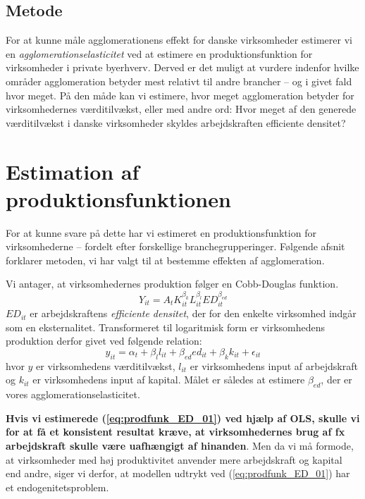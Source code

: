 \subsection{Metode}
For at kunne måle agglomerationens effekt for danske virksomheder estimerer vi en \emph{agglomerationselasticitet} ved at estimere en produktionsfunktion for virksomheder i private byerhverv. Derved er det muligt at vurdere indenfor hvilke områder agglomeration betyder mest relativt til andre brancher -- og i givet fald hvor meget. På den måde kan vi estimere, hvor meget agglomeration betyder for virksomhedernes værditilvækst, eller med andre ord: Hvor meget af den generede værditilvækst i danske virksomheder skyldes arbejdskraften efficiente densitet?
\section{Estimation af produktionsfunktionen}
For at kunne svare på dette har vi estimeret en produktionsfunktion for virksomhederne -- fordelt efter forskellige branchegrupperinger. Følgende afsnit forklarer metoden, vi har valgt til at bestemme effekten af agglomeration.

Vi antager, at virksomhedernes produktion følger en Cobb-Douglas funktion. 
\begin{equation}
	Y_{it} = A_t K_{it}^{\beta_k} L_{it}^{\beta_l} 
	ED_{it}^{\beta_{ed}}  
\end{equation}
$ED_{it}$ er arbejdskraftens \emph{efficiente densitet}, der for den enkelte virksomhed indgår som en eksternalitet.
Transformeret til logaritmisk form er virksomhedens produktion derfor givet ved følgende relation:
\begin{equation}
	y_{it} = \alpha_t + \beta_l l_{it} + \beta_{ed} ed_{it} + \beta_{k} k_{it} + \epsilon_{it}
	\label{eq:prodfunk_ED_01}
\end{equation}
hvor $y$ er virksomhedens værditilvækst, $l_{it}$ er virksomhedens input af arbejdskraft og $k_{it}$ er virksomhedens input af kapital. Målet er således at estimere $\beta_{ed}$, der er vores agglomerationselasticitet.

\textbf{Hvis vi estimerede (\ref{eq:prodfunk_ED_01}) ved hjælp af OLS, skulle vi for at få et konsistent resultat kræve, at virksomhedernes brug af fx arbejdskraft skulle være uafhængigt af hinanden}. Men da vi må formode, at virksomheder med høj produktivitet anvender mere arbejdskraft og kapital end andre, siger vi derfor, at modellen udtrykt ved (\ref{eq:prodfunk_ED_01}) har et endogenitetsproblem.

